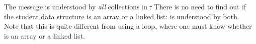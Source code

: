 \documentclass[a4paper,10pt,twoside]{book}
\begin{document}
The message  is understood by \emph{all} collections in \st.
There is no need to find out if the student data structure is an array or a linked list:
 is understood by both.
Note that this is quite different from using a loop, where one must know whether  is an array or a linked list.


\end{document}
